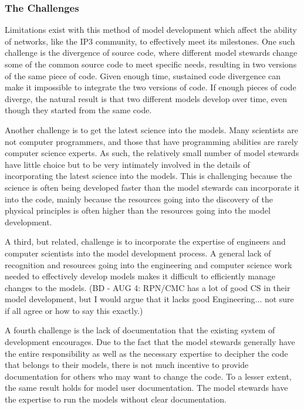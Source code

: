 \documentclass[hess]{copernicus}
\begin{document}
\subsubsection{The Challenges}
Limitations exist with this method of model development which affect the ability of networks, like the IP3 community, to effectively meet its milestones. One such challenge is the divergence of source code, where different model stewards change some of the common source code to meet specific needs, resulting in two versions of the same piece of code. Given enough time, sustained code divergence can make it impossible to integrate the two versions of code. If enough pieces of code diverge, the natural result is that two different models develop over time, even though they started from the same code.

Another challenge is to get the latest science into the models. Many scientists are not computer programmers, and those that have programming abilities are rarely computer science experts. As such, the relatively small number of model stewards have little choice but to be very intimately involved in the details of incorporating the latest science into the models. This is challenging because the science is often being developed faster than the model stewards can incorporate it into the code, mainly because the resources going into the discovery of the physical principles is often higher than the resources going into the model development.

A third, but related, challenge is to incorporate the expertise of engineers and computer scientists into the model development process. A general lack of recognition and resources going into the engineering and computer science work needed to effectively develop models makes it difficult to efficiently manage changes to the models. (BD - AUG 4: RPN/CMC has a lot of good CS in their model development, but I would argue that it lacks good Engineering... not sure if all agree or how to say this exactly.)

A fourth challenge is the lack of documentation that the existing system of development encourages. Due to the fact that the model stewards generally have the entire responsibility as well as the necessary expertise to decipher the code that belongs to their models, there is not much incentive to provide documentation for others who may want to change the code. To a lesser extent, the same result holds for model user documentation. The model stewards have the expertise to run the models without clear documentation. 
\end{document}
